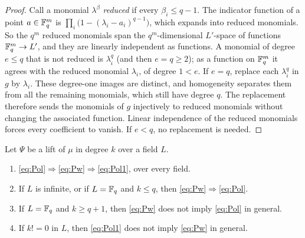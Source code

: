 \begin{proof}
Call a monomial $\lambda^\beta$ \emph{reduced} if every $\beta_i\le q-1$. The indicator function of a point
$a\in\mathbb F_q^m$ is $\prod_i\bigl(1-(\lambda_i-a_i)^{q-1}\bigr)$, which expands into reduced monomials. So the $q^m$ reduced
monomials span the $q^m$\nobreakdash-dimensional $L'$\nobreakdash-space of functions $\mathbb F_q^m\to L'$, and they are linearly independent as
functions. A monomial of degree $e\le q$ that is not reduced is $\lambda_i^q$ (and then $e=q\ge2$); as a function on
$\mathbb F_q^m$ it agrees with the reduced monomial $\lambda_i$, of degree $1<e$. If $e=q$, replace each $\lambda_i^q$ in $g$ by
$\lambda_i$. These degree-one images are distinct, and homogeneity separates them from all the remaining monomials,
which still have degree $q$. The replacement therefore sends the monomials of $g$ injectively to reduced monomials
without changing the associated function. Linear independence of the reduced monomials forces every coefficient to
vanish. If $e<q$, no replacement is needed.
\end{proof}

\begin{proposition}\label{prop:diag}
Let $\Psi$ be a lift of $\mu$ in degree $k$ over a field $L$.
\begin{enumerate}
\item \eqref{eq:Pol}$\Rightarrow$\eqref{eq:Pw}$\Rightarrow$\eqref{eq:Pol1}, over every field.
\item If $L$ is infinite, or if $L=\mathbb F_q$ and $k\le q$, then \eqref{eq:Pw}$\Rightarrow$\eqref{eq:Pol}.
\item If $L=\mathbb F_q$ and $k\ge q+1$, then \eqref{eq:Pw} does not imply \eqref{eq:Pol} in general.
\item If $k!=0$ in $L$, then \eqref{eq:Pol1} does not imply \eqref{eq:Pw} in general.
\end{enumerate}
\end{proposition}

